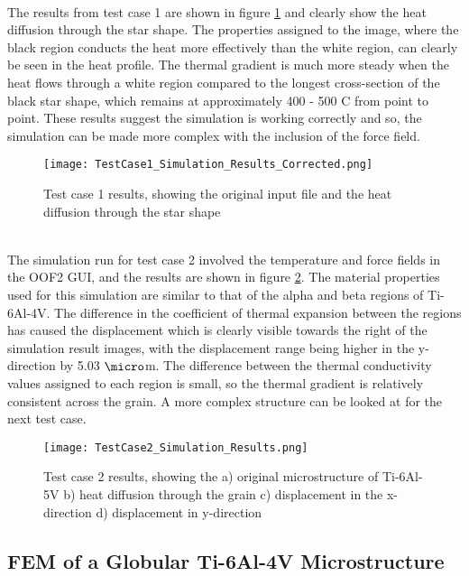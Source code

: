 \documentclass[report.tex]{subfiles}
\begin{document}
\\
The results from test case 1 are shown in figure \ref{fig:TestCase1Results} and clearly show the heat diffusion through the star shape. The properties assigned to the image, where the black region conducts the heat more effectively than the white region, can clearly be seen in the heat profile. The thermal gradient is much more steady when the heat flows through a white region compared to the longest cross-section of the black star shape, which remains at approximately 400 - 500 \degree C from point to point. These results suggest the simulation is working correctly and so, the simulation can be made more complex with the inclusion of the force field.
\\
\begin{figure}[h]
    \centering
    \texttt{[image: TestCase1\_Simulation\_Results\_Corrected.png]}
    \caption{Test case 1 results, showing the original input file and the heat diffusion through the star shape}
    \label{fig:TestCase1Results}
\end{figure}
\\
The simulation run for test case 2 involved the temperature and force fields in the OOF2 GUI, and the results are shown in figure \ref{fig:TestCase2Results}. The material properties used for this simulation are similar to that of the alpha and beta regions of Ti-6Al-4V. The difference in the coefficient of thermal expansion between the regions has caused the displacement which is clearly visible towards the right of the simulation result images, with the displacement range being higher in the y-direction by 5.03 $\micro$m. The difference between the thermal conductivity values assigned to each region is small, so the thermal gradient is relatively consistent across the grain. A more complex structure can be looked at for the next test case.
\\
\begin{figure}[htp]
    \centering
    \texttt{[image: TestCase2\_Simulation\_Results.png]}
    \caption{Test case 2 results, showing the a) original microstructure of Ti-6Al-5V b) heat diffusion through the grain c) displacement in the x-direction d) displacement in y-direction}
    \label{fig:TestCase2Results}
\end{figure}

\subsection{FEM of a Globular Ti-6Al-4V Microstructure}
\end{document}
